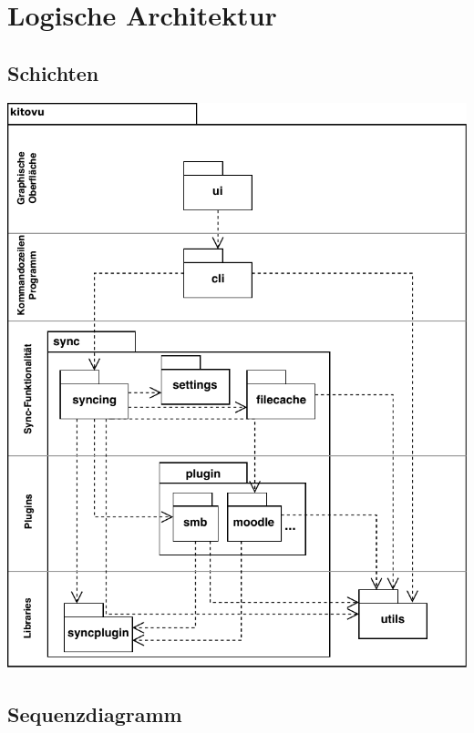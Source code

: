 \documentclass[a4paper]{article}
\let\oldsection\section
\renewcommand\section{\clearpage\oldsection}
\begin{document}
\section{Logische Architektur}



\subsection{Schichten}

\includegraphics[width=40em]{./img/schichtendiagramm.pdf}

\newpage

\subsection{Sequenzdiagramm}
\end{document}
